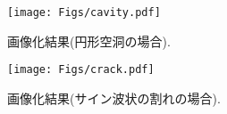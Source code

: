 \begin{figure}[h]
	\begin{center}
	\texttt{[image: Figs/cavity.pdf]} 
	\end{center}
	\caption{画像化結果(円形空洞の場合).} 
	\label{fig:cavity}
\end{figure}
\begin{figure}[h]
	\begin{center}
	\texttt{[image: Figs/crack.pdf]} 
	\end{center}
	\caption{画像化結果(サイン波状の割れの場合).} 
	\label{fig:crack}
\end{figure}
